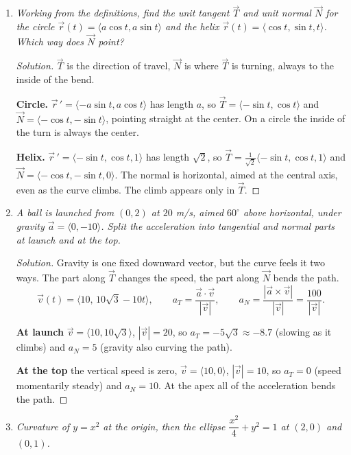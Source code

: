 \documentclass[12pt]{article}
\newenvironment{solution}
  {\renewcommand\qedsymbol{$\blacksquare$}\begin{proof}[Solution]}
  {\end{proof}}
\begin{document}
\begin{enumerate}
\begin{enumerate}
    \item \textit{Working from the definitions, find the unit tangent $\vec T$ and unit normal $\vec N$ for the circle $\vec r(t)=\langle a\cos t,a\sin t\rangle$ and the helix $\vec r(t)=\langle\cos t,\sin t,t\rangle$. Which way does $\vec N$ point?}

    \begin{solution}
    $\vec T$ is the direction of travel, $\vec N$ is where $\vec T$ is turning, always to the inside of the bend.

    \medskip\noindent\textbf{Circle.} $\vec r\,'=\langle-a\sin t,a\cos t\rangle$ has length $a$, so $\vec T=\langle-\sin t,\cos t\rangle$ and $\vec N=\langle-\cos t,-\sin t\rangle$, pointing straight at the center. On a circle the inside of the turn is always the center.

    \medskip\noindent\textbf{Helix.} $\vec r\,'=\langle-\sin t,\cos t,1\rangle$ has length $\sqrt2$, so $\vec T=\tfrac{1}{\sqrt2}\langle-\sin t,\cos t,1\rangle$ and $\vec N=\langle-\cos t,-\sin t,0\rangle$. The normal is horizontal, aimed at the central axis, even as the curve climbs. The climb appears only in $\vec T$.
    \end{solution}

    \item \textit{A ball is launched from $(0,2)$ at $20$ m/s, aimed $60^\circ$ above horizontal, under gravity $\vec a=\langle0,-10\rangle$. Split the acceleration into tangential and normal parts at launch and at the top.}

    \begin{solution}
    Gravity is one fixed downward vector, but the curve feels it two ways. The part along $\vec T$ changes the speed, the part along $\vec N$ bends the path.
    \[
      \vec v(t)=\langle10,\,10\sqrt3-10t\rangle,\qquad a_T=\frac{\vec a\cdot\vec v}{|\vec v|},\qquad a_N=\frac{|\vec a\times\vec v|}{|\vec v|}=\frac{100}{|\vec v|}.
    \]

    \medskip\noindent\textbf{At launch} $\vec v=\langle10,10\sqrt3\rangle$, $|\vec v|=20$, so $a_T=-5\sqrt3\approx-8.7$ (slowing as it climbs) and $a_N=5$ (gravity also curving the path).

    \medskip\noindent\textbf{At the top} the vertical speed is zero, $\vec v=\langle10,0\rangle$, $|\vec v|=10$, so $a_T=0$ (speed momentarily steady) and $a_N=10$. At the apex all of the acceleration bends the path.
    \end{solution}

    \item \textit{Curvature of $y=x^2$ at the origin, then the ellipse $\dfrac{x^2}{4}+y^2=1$ at $(2,0)$ and $(0,1)$.}


\end{enumerate}
\end{enumerate}
\end{document}
